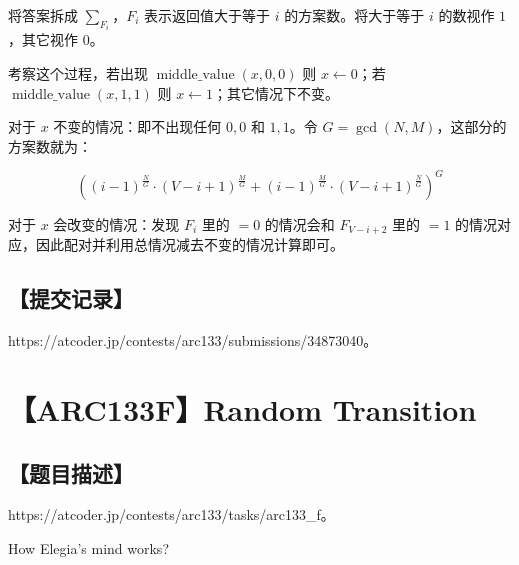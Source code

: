 \documentclass[UTF8,12pt,a4paper]{ctexart}
\begin{document}
	将答案拆成 $\sum_{F_i}$，$F_i$ 表示返回值大于等于 $i$ 的方案数。将大于等于 $i$ 的数视作 $1$，其它视作 $0$。
	
	考察这个过程，若出现 $\operatorname{middle\_value}\left(x,0,0\right)$ 则 $x\leftarrow 0$；若 $\operatorname{middle\_value}\left(x,1,1\right)$ 则 $x\leftarrow 1$；其它情况下不变。
	
	对于 $x$ 不变的情况：即不出现任何 $0,0$ 和 $1,1$。令 $G=\gcd(N,M)$，这部分的方案数就为：
	
	$$
	\left((i-1)^{\frac NG}\cdot(V-i+1)^{\frac MG}+(i-1)^{\frac MG}\cdot(V-i+1)^{\frac NG}\right)^G
	$$
	
	对于 $x$ 会改变的情况：发现 $F_i$ 里的 $=0$ 的情况会和 $F_{V-i+2}$ 里的 $=1$ 的情况对应，因此配对并利用总情况减去不变的情况计算即可。
	
	\subsection*{【提交记录】}
	
	https://atcoder.jp/contests/arc133/submissions/34873040。
	
	
	\section*{【ARC133F】Random Transition}
	
	\subsection*{【题目描述】}
	
	https://atcoder.jp/contests/arc133/tasks/arc133\_f。
	
	How Elegia's mind works?
	
\end{document}
